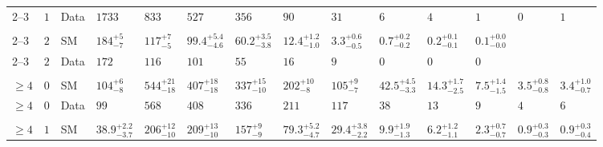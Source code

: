 \begin{landscape}
\begin{center}
\begin{table}[h!]
\begin{tabular}{ llllllllllllll }
    2--3                 & $1$      & Data & $1733$                         & $833$                          & $527$                          & $356$                          & $90$                           & $31$                           & $6$                            & $4$                            & $1$                            & $0$                            & $1$                            \\\\
    2--3                 & $2$      & SM   & $184^{+5}_{-7}$                &$117^{+7}_{-5}$    & $99.4^{+5.4}_{-4.6}$           & $60.2^{+3.5}_{-3.8}$           & $12.4^{+1.2}_{-1.0}$           & $3.3^{+0.6}_{-0.5}$            & $0.7^{+0.2}_{-0.2}$            & $0.2^{+0.1}_{-0.1}$            & $0.1^{+0.0}_{-0.0}$            \\
    2--3                 & $2$      & Data & $172$                          & $116$                          & $101$                          & $55$                           & $16$                           & $9$                            & $0$                            & $0$                            & $0$                            \\ \\
    $\geq 4$             & $0$      & SM   & $104^{+6}_{-8}$                & $544^{+21}_{-18}$              & $407^{+18}_{-18}$              & $337^{+15}_{-10}$              & $202^{+10}_{-8}$               & $105^{+9}_{-7}$                & $42.5^{+4.5}_{-3.3}$           & $14.3^{+1.7}_{-2.5}$           & $7.5^{+1.4}_{-1.5}$            & $3.5^{+0.8}_{-0.8}$            & $3.4^{+1.0}_{-0.7}$            \\ 
    $\geq 4$             & $0$      & Data & $99$                           & $568$                          & $408$                          & $336$                          & $211$                          & $117$                          & $38$                           & $13$                           & $9$                            & $4$                            & $6$                            \\\\
    $\geq 4$             & $1$      & SM   & $38.9^{+2.2}_{-3.7}$           & $206^{+12}_{-10}$              & $209^{+13}_{-10}$              & $157^{+9}_{-9}$                & $79.3^{+5.2}_{-4.7}$           & $29.4^{+3.8}_{-2.2}$           & $9.9^{+1.9}_{-1.3}$            & $6.2^{+1.2}_{-1.1}$            & $2.3^{+0.7}_{-0.7}$            & $0.9^{+0.3}_{-0.3}$            & $0.9^{+0.3}_{-0.4}$            \\ 

\end{tabular}
\end{table}
\end{center}
\end{landscape}
